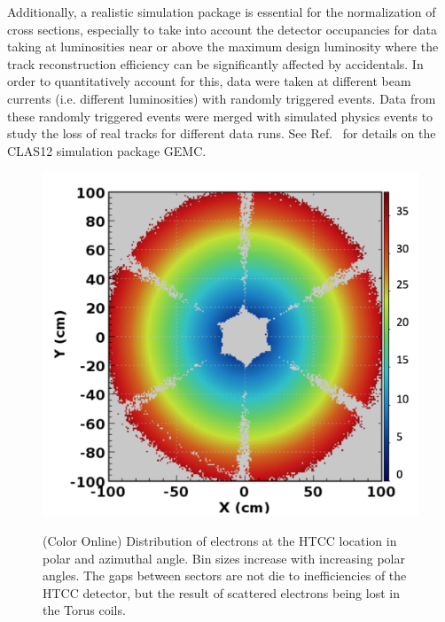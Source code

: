 \documentclass[final,3p,twocolumn]{elsarticle}
\begin{document}
Additionally, a realistic simulation package is essential for the normalization of cross sections, especially to take into
account the detector occupancies for data taking at luminosities near or above the maximum design luminosity where the
track reconstruction efficiency can be significantly affected by accidentals. In order to quantitatively account for this,
data were taken at different beam currents (i.e. different luminosities) with randomly triggered events. Data from these 
randomly triggered events were merged with simulated physics events to study the loss of real tracks for different 
data runs. See Ref.~\cite{GEMC} for details on the CLAS12 simulation package GEMC.



\begin{figure}[t!]
{\includegraphics[width=1.0\columnwidth]{htcc-dis.png}}
\caption{(Color Online) Distribution of electrons at the HTCC location in polar and azimuthal angle. Bin sizes increase with
increasing polar angles. The gaps between sectors are not die to inefficiencies of the HTCC detector, but the result
of scattered electrons being lost in the Torus coils.} 

\end{figure}
\end{document}

